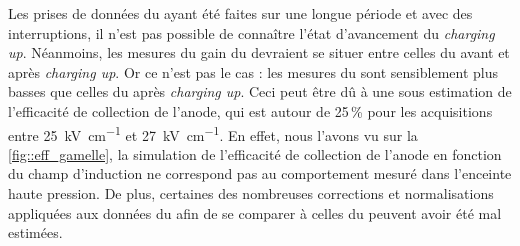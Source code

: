       Les prises de données du \TOO{} ayant été faites sur une longue période et avec des interruptions, il n'est pas possible de connaître l'état d'avancement du \textit{charging up}. Néanmoins, les mesures du gain du \TOO{} devraient se situer entre celles du \threeL{} avant et après \textit{charging up}. Or ce n'est pas le cas : les mesures du \TOO{} sont sensiblement plus basses que celles du \threeL{} après \textit{charging up}. Ceci peut être dû à une sous estimation de l'efficacité de collection de l'anode, qui est autour de 25\,\% pour les acquisitions entre \SI{25}{\kilo\volt\per\centi\meter} et \SI{27}{\kilo\volt\per\centi\meter}. En effet, nous l'avons vu sur la \autoref{fig::eff_gamelle}, la simulation de l'efficacité de collection de l'anode en fonction du champ d'induction ne correspond pas au comportement mesuré dans l'enceinte haute pression. De plus, certaines des nombreuses corrections et normalisations appliquées aux données du \TOO{} afin de se comparer à celles du \threeL{} peuvent avoir été mal estimées.
%
%

